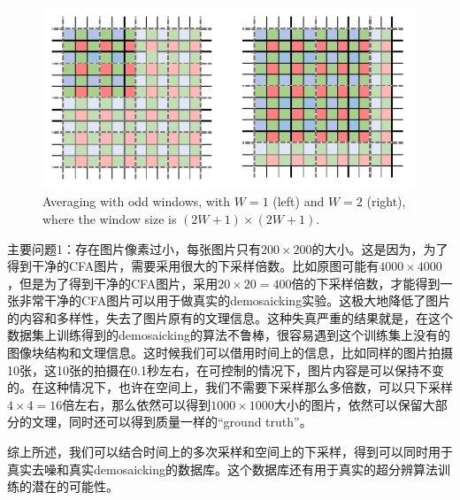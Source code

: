 \documentclass[10pt,twocolumn,letterpaper]{article}
\begin{document}
\begin{figure}
\centering
\includegraphics[width=0.95\linewidth]{CFA.png}
\caption{Averaging with odd windows, with $W = 1$ (left) and $W = 2$ (right),
where the window size is $(2W + 1)\times (2W + 1)$.
}
\label{fig1}
\end{figure}


主要问题1：存在图片像素过小，每张图片只有$200\times200$的大小。这是因为，为了得到干净的CFA图片，需要采用很大的下采样倍数。比如原图可能有$4000\times4000$，但是为了得到干净的CFA图片，采用$20\times20=400$倍的下采样倍数，才能得到一张非常干净的CFA图片可以用于做真实的demosaicking实验。这极大地降低了图片的内容和多样性，失去了图片原有的文理信息。这种失真严重的结果就是，在这个数据集上训练得到的demosaicking的算法不鲁棒，很容易遇到这个训练集上没有的图像块结构和文理信息。这时候我们可以借用时间上的信息，比如同样的图片拍摄10张，这10张的拍摄在0.1秒左右，在可控制的情况下，图片内容是可以保持不变的。在这种情况下，也许在空间上，我们不需要下采样那么多倍数，可以只下采样$4\times4=16$倍左右，那么依然可以得到$1000\times1000$大小的图片，依然可以保留大部分的文理，同时还可以得到质量一样的``ground truth''。

综上所述，我们可以结合时间上的多次采样和空间上的下采样，得到可以同时用于真实去噪和真实demosaicking的数据库。这个数据库还有用于真实的超分辨算法训练的潜在的可能性。



{
\small


}
\end{document}
